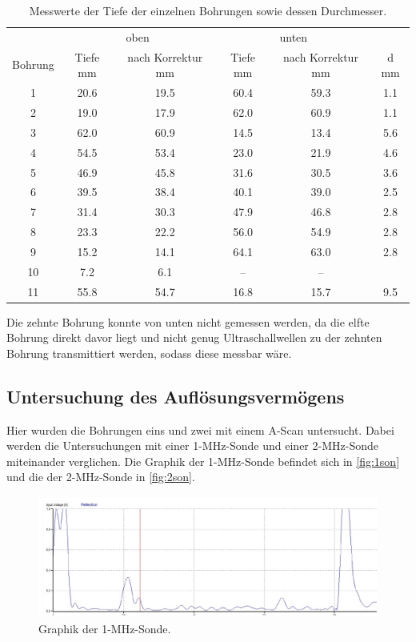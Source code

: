 \begin{table}
    \centering 
    \caption{Messwerte der Tiefe der einzelnen Bohrungen sowie dessen Durchmesser.}
\begin{tabular}{c | c c | c c | c}
    \toprule
    & \multicolumn{2}{c}{oben}& \multicolumn{2}{c}{unten} & \\
    Bohrung & Tiefe \/\unit{\mm} &  nach Korrektur \/\unit{\mm}& Tiefe \/ \unit{\mm} & nach Korrektur \/ \unit{\mm} & d \/ \unit{\mm}\\
    \midrule
                        1&20.6&19.5&60.4&59.3&1.1 \\
                         2&19.0&17.9&62.0&60.9&1.1 \\
                         3&62.0&60.9&14.5&13.4&5.6 \\
                         4&54.5&53.4&23.0&21.9&4.6 \\
                         5&46.9&45.8&31.6&30.5&3.6 \\
                         6&39.5&38.4&40.1&39.0&2.5 \\
                         7&31.4&30.3&47.9&46.8&2.8 \\
                         8&23.3&22.2&56.0&54.9&2.8 \\
                         9&15.2&14.1&64.1&63.0&2.8 \\
                        10&7.2&6.1&--&--& \\
                        11&55.8&54.7&16.8&15.7&9.5 \\
                        \bottomrule
    \end{tabular}
    \label{tab:AScan}
\end{table}

Die zehnte Bohrung konnte von unten nicht gemessen werden, da die elfte Bohrung direkt davor liegt und nicht genug Ultraschallwellen zu der zehnten Bohrung 
transmittiert werden, sodass diese messbar wäre.

\subsection{Untersuchung des Auflösungsvermögens}
Hier wurden die Bohrungen eins und zwei mit einem A-Scan untersucht. Dabei werden die Untersuchungen mit einer 1-MHz-Sonde und einer 2-MHz-Sonde miteinander
verglichen. Die Graphik der 1-MHz-Sonde befindet sich in \autoref{fig:1son} und die der 2-MHz-Sonde in \autoref{fig:2son}.

\begin{figure}
    \centering
    \includegraphics[height = 4cm]{1MHz.pdf}
    \caption{Graphik der 1-MHz-Sonde.}
    \label{fig:1son}
\end{figure}

